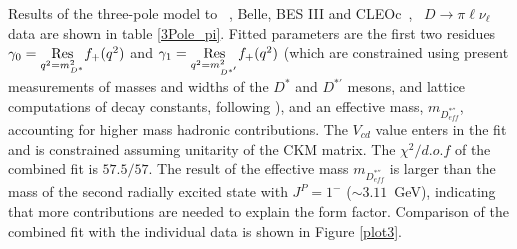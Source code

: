 \vspace{0.5cm}
Results of the three-pole model \cite{Becirevic:2014kaa} to \babar~\cite{babar-new}, Belle\cite{Widhalm:2006wz}, BES III\cite{BESIII-new} and 
CLEOc~\cite{Besson:2009uv},~\cite{Dobbs:2007aa} $D \to \pi \ell \nu_\ell $ data are shown in table \ref{3Pole_pi}. 
Fitted parameters are the first two residues $\gamma_{0}=\underset{ q^2=m_{D^{\ast}}^2} {\rm Res} f_+(q^2) $ 
and $\gamma_{1}=\underset{q^2=m_{D^{\ast '}}^2}{\rm Res} f_+(q^2)$ (which are constrained using present measurements 
of masses and widths of the $D^\ast$ and $D^{\ast '}$ mesons, and lattice computations of decay constants, following  \cite{Becirevic:2014kaa}), 
and an effective mass, $m_{D^{\ast ''}_{eff}}$, accounting for higher mass hadronic contributions.
The $V_{cd}$ value enters in the fit and is constrained assuming unitarity of the CKM matrix.
The $\chi^2/d.o.f$ of the combined fit is $57.5/57$. The result of the effective mass $m_{D^{\ast ''}_{eff}}$ is larger than the mass of the 
second radially excited state with $J^P = 1^{-}$ ($\sim 3.11$~GeV), indicating that more contributions are needed to explain the form factor. 
Comparison of the combined fit with the individual data is shown in Figure \ref{plot3}.

